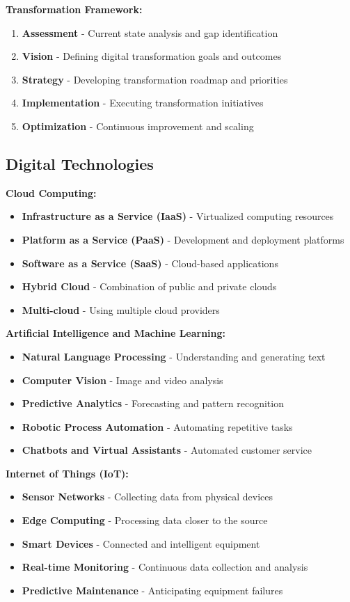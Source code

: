\documentclass[12pt]{article}
\begin{document}
\textbf{Transformation Framework:}
\begin{enumerate}
    \item \textbf{Assessment} - Current state analysis and gap identification
    \item \textbf{Vision} - Defining digital transformation goals and outcomes
    \item \textbf{Strategy} - Developing transformation roadmap and priorities
    \item \textbf{Implementation} - Executing transformation initiatives
    \item \textbf{Optimization} - Continuous improvement and scaling
\end{enumerate}

\subsection{Digital Technologies}

\textbf{Cloud Computing:}
\begin{itemize}
    \item \textbf{Infrastructure as a Service (IaaS)} - Virtualized computing resources
    \item \textbf{Platform as a Service (PaaS)} - Development and deployment platforms
    \item \textbf{Software as a Service (SaaS)} - Cloud-based applications
    \item \textbf{Hybrid Cloud} - Combination of public and private clouds
    \item \textbf{Multi-cloud} - Using multiple cloud providers
\end{itemize}

\textbf{Artificial Intelligence and Machine Learning:}
\begin{itemize}
    \item \textbf{Natural Language Processing} - Understanding and generating text
    \item \textbf{Computer Vision} - Image and video analysis
    \item \textbf{Predictive Analytics} - Forecasting and pattern recognition
    \item \textbf{Robotic Process Automation} - Automating repetitive tasks
    \item \textbf{Chatbots and Virtual Assistants} - Automated customer service
\end{itemize}

\textbf{Internet of Things (IoT):}
\begin{itemize}
    \item \textbf{Sensor Networks} - Collecting data from physical devices
    \item \textbf{Edge Computing} - Processing data closer to the source
    \item \textbf{Smart Devices} - Connected and intelligent equipment
    \item \textbf{Real-time Monitoring} - Continuous data collection and analysis
    \item \textbf{Predictive Maintenance} - Anticipating equipment failures
\end{itemize}
\end{document}
